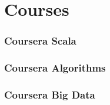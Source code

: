 \documentclass[11pt]{article}
\begin{document}
\section*{Courses}
\label{sec:org58f84ce}
\subsubsection*{Coursera Scala}
\label{sec:org4a75a3f}
\subsubsection*{Coursera Algorithms}
\label{sec:org284b9a9}
\subsubsection*{Coursera Big Data}
\label{sec:orgaf5e8e7}
\end{document}
